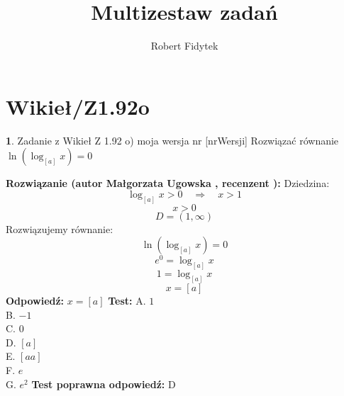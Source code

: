 \documentclass[12pt, a4paper]{article}
\title{Multizestaw zadań}
\author{Robert Fidytek}
\date{}
\theoremstyle{definition} %
\newtheorem{zad}{}
\newcommand{\kategoria}[1]{\section{#1}} %
\newcommand{\zadStart}[1]{\begin{zad}#1\newline} %
\newcommand{\zadStop}{\end{zad}}   %
\newcommand{\rozwStart}[2]{\noindent \textbf{Rozwiązanie (autor #1 , recenzent #2): }\newline} %
\newcommand{\rozwStop}{\newline}                                            %
\newcommand{\odpStart}{\noindent \textbf{Odpowiedź:}\newline}    %
\newcommand{\odpStop}{\newline}                                             %
\newcommand{\testStart}{\noindent \textbf{Test:}\newline} %
\newcommand{\testStop}{\newline} %
\newcommand{\kluczStart}{\noindent \textbf{Test poprawna odpowiedź:}\newline} %
\newcommand{\kluczStop}{\newline} %
\begin{document}
\maketitle


\kategoria{Wikieł/Z1.92o}
\zadStart{Zadanie z Wikieł Z 1.92 o) moja wersja nr [nrWersji]}
Rozwiązać równanie $\ln{(\log_{[a]}{x})}=0$
\zadStop
\rozwStart{Małgorzata Ugowska}{}
Dziedzina:
$$\log_{[a]}{x}>0 \quad \Longrightarrow \quad x>1$$
$$x>0$$
$$D =  (1, \infty)$$
Rozwiązujemy równanie:
$$\ln{(\log_{[a]}{x})}=0$$
$$e^{0}= \log_{[a]}{x}$$
$$1= \log_{[a]}{x}$$
$$x = [a]$$
\rozwStop
\odpStart
$x =[a]$
\odpStop
\testStart
A. $1$\\
B. $-1$\\
C. $0$\\
D. $[a]$\\
E. $[aa]$\\
F. $e$\\
G. $e^2$
\testStop
\kluczStart
D
\kluczStop
\end{document}
